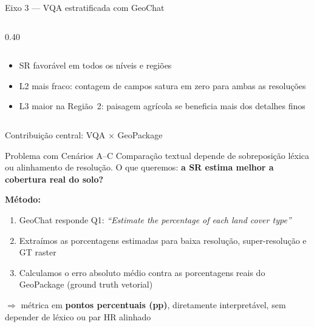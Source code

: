 \documentclass[aspectratio=169]{beamer}
\begin{document}
\begin{frame}{Eixo 3 — VQA estratificada com GeoChat}
\begin{columns}[T]
\begin{column}{0.40\textwidth}
\begin{tabular}{@{}lcc@{}}
        \bottomrule
      \end{tabular}
      \vspace{0.4em}
      \begin{itemize}\scriptsize
        \item SR favorável em todos os níveis e regiões
        \item L2 mais fraco: contagem de campos satura em zero para ambas as resoluções
        \item L3 maior na Região~2: paisagem agrícola se beneficia mais dos detalhes finos
      \end{itemize}
    \end{column}
  \end{columns}

\end{frame}

\begin{frame}{Contribuição central: VQA × GeoPackage}

  \begin{block}{Problema com Cenários A--C}
    Comparação textual depende de sobreposição léxica ou alinhamento de resolução.
    O que queremos: \textbf{a SR estima melhor a cobertura real do solo?}
  \end{block}

  \vspace{0.3em}
  \textbf{Método:}
  \begin{enumerate}
    \item GeoChat responde Q1: \textit{``Estimate the percentage of each land cover type''}
    \item Extraímos as porcentagens estimadas para baixa resolução, super-resolução e GT raster
    \item Calculamos o erro absoluto médio contra as porcentagens reais do GeoPackage (ground truth vetorial)
  \end{enumerate}

  \vspace{0.2em}
  $\Rightarrow$ métrica em \textbf{pontos percentuais (pp)}, diretamente interpretável,
  sem depender de léxico ou par HR alinhado

\end{frame}
\end{document}
